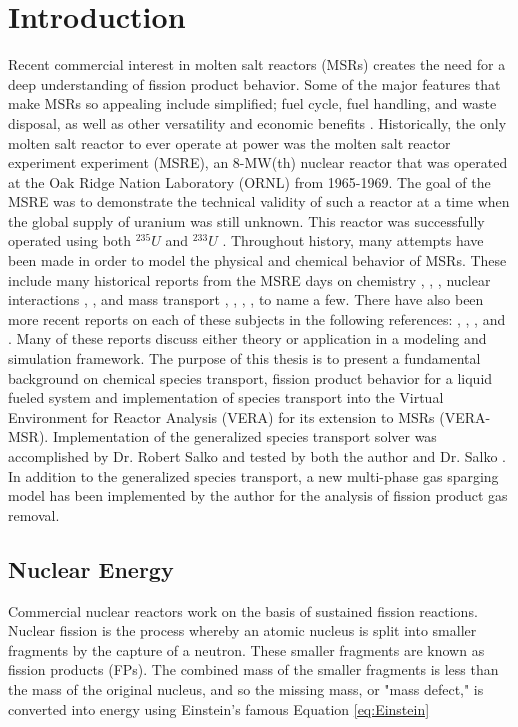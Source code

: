 \chapter{Introduction} \label{ch:introduction}

Recent commercial interest in molten salt reactors (MSRs) creates the need for a deep understanding of fission product behavior. Some of the major features that make MSRs so appealing include simplified; fuel cycle, fuel handling, and waste disposal, as well as other versatility and economic benefits \cite{williams1996}. Historically, the only molten salt reactor to ever operate at power was the molten salt reactor experiment experiment (MSRE), an 8-MW(th) nuclear reactor that was operated at the Oak Ridge Nation Laboratory (ORNL) from 1965-1969. The goal of the MSRE was to demonstrate the technical validity of such a reactor at a time when the global supply of uranium was still unknown. This reactor was successfully operated using both ${}^{235}U$ and ${}^{233}U$ \cite{engel1970}. Throughout history, many attempts have been made in order to model the physical and chemical behavior of MSRs. These include many historical reports from the MSRE days on chemistry \cite{grimes1970}, \cite{baes1965}, \cite{cantor1968}, nuclear interactions \cite{nestor1960}, \cite{bell1970}, \cite{prince1962} and mass transport \cite{engel1971}, \cite{peebles1968}, \cite{kedl1967}, \cite{kedl1972}, to name a few. There have also been more recent reports on each of these subjects in the following references: \cite{cammi2011}, \cite{benes2008}, \cite{eades2016}, \cite{wu2017} and \cite{zack2018}. Many of these reports discuss either theory or application in a modeling and simulation framework. The purpose of this thesis is to present a fundamental background on chemical species transport, fission product behavior for a liquid fueled system and implementation of species transport into the Virtual Environment for Reactor Analysis (VERA) for its extension to MSRs (VERA-MSR). Implementation of the generalized species transport solver was accomplished by Dr. Robert Salko and tested by both the author and Dr. Salko \cite{zack2018}. In addition to the generalized species transport, a new multi-phase gas sparging model has been implemented by the author for the analysis of fission product gas removal. 



\section{Nuclear Energy}
Commercial nuclear reactors work on the basis of sustained fission reactions. Nuclear fission is the process whereby an atomic nucleus is split into smaller fragments by the capture of a neutron. These smaller fragments are known as fission products (FPs). The combined mass of the smaller fragments is less than the mass of the original nucleus, and so the missing mass, or "mass defect," is converted into energy using Einstein's famous Equation \ref{eq:Einstein}

